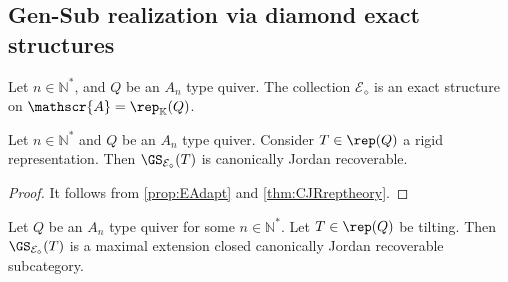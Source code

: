 \subsection{Gen-Sub realization via diamond exact structures}
\label{ss:GenSubmCJR}

\begin{prop}
 \label{prop:EdiamondExactStructureTypeA}
     Let $n \in \mathbb{N}^*$, and $Q$ be an $A_n$ type quiver. The collection $\mathcal{E}_{\diamond}$ is an exact structure on $\mathscr{A} = \rep_\mathbb{K}(Q)$.
 \end{prop}

\begin{prop}
\label{propGSCJR}
 Let $n \in \mathbb{N}^*$ and $Q$ be an $A_n$ type quiver. Consider $T \in \rep(Q)$ a rigid representation. Then $\GS_{\mathcal{E_\diamond}}(T)$ is canonically Jordan recoverable.
\end{prop}

\begin{proof}
It follows from \cref{prop:EAdapt} and \cref{thm:CJRreptheory}.
\end{proof}


\begin{theorem}
\label{thm:maximal}
Let $Q$ be an $A_n$ type quiver for some $n \in \mathbb{N}^*$. Let $T \in \rep(Q)$ be tilting. Then $\GS_{\mathcal{E_\diamond}}(T)$ is a maximal extension closed canonically Jordan recoverable subcategory.
\end{theorem}

